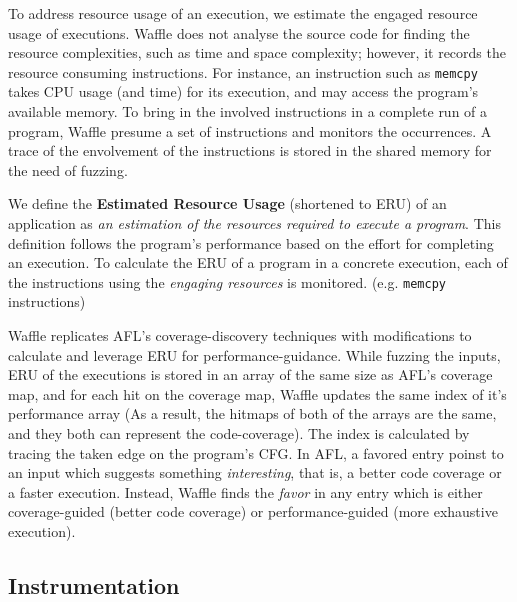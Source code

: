 
To address resource usage of an execution, we estimate the engaged resource usage of executions. Waffle does not analyse the source code for finding the resource complexities, such as time and space complexity; however, it records the resource consuming instructions. For instance, an instruction such as \texttt{memcpy} takes CPU usage (and time) for its execution, and may access the program's available memory. To bring in the involved instructions in a complete run of a program, Waffle presume a set of instructions and monitors the occurrences. A trace of the envolvement of the instructions is stored in the shared memory for the need of fuzzing.


We define the \textbf{Estimated Resource Usage} (shortened to ERU) of an application as \textit{an estimation of the resources required to execute a program}. This definition follows the program's performance based on the effort for completing an execution. To calculate the ERU of a program in a concrete execution, each of the instructions using the \textit{engaging resources} is monitored. (e.g. \texttt{memcpy} instructions)  


Waffle replicates AFL's coverage-discovery techniques with modifications to calculate and leverage ERU for performance-guidance. While fuzzing the inputs, ERU of the executions is stored in an array of the same size as AFL's coverage map, and for each hit on the coverage map, Waffle updates the same index of it's performance array (As a result, the hitmaps of both of the arrays are the same, and they both can represent the code-coverage). The index is calculated by tracing the taken edge on the program's CFG. In AFL, a favored entry poinst to an input which suggests something \textit{interesting}, that is, a better code coverage or a faster execution. Instead, Waffle finds the \textit{favor} in any entry which is either coverage-guided (better code coverage) or performance-guided (more exhaustive execution).

\subsection{Instrumentation}
\label{subsec:inst}

